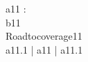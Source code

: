 \begin{circus}
\circchannel a11 : \nat \\
\circchannel b11 \\
\circprocess Roadtocoverage11 \circdef \circbegin \\
	\circspot
	    a11.1 \then \Skip \lpar | \lchanset a11 \rchanset | \rpar a11.1 \then \Skip
	    \\
	\circend
\end{circus}
